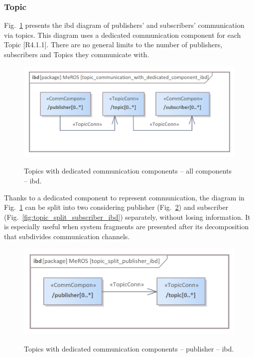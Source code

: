 \documentclass{ieeeaccess}
\begin{document}
	\subsubsection{Topic}
	\label{sec:metamodel-topic}
		
	Fig.~\ref{fig:topic_communication_with_dedicated_component_ibd} presents the ibd diagram of publishers' and subscribers' communication via topics. This diagram uses a dedicated communication component for each Topic [R4.1.1]. There are no general limits to the number of publishers, subscribers and Topics they communicate with. 
	
	\begin{figure}[htb]
		\centering
		\begin{center}
			{\includegraphics[scale=0.8]{img/meros_pkg/topic_communication_with_dedicated_component_ibd.png}}
		\end{center}
		\caption{Topics with dedicated communication components -- all components -- ibd.} 
		\label{fig:topic_communication_with_dedicated_component_ibd}
	\end{figure}

	Thanks to a dedicated component to represent communication, the diagram in Fig.~\ref{fig:topic_communication_with_dedicated_component_ibd} can be split into two considering publisher (Fig.~\ref{fig:topic_split_publisher_ibd}) and subscriber (Fig.~\ref{fig:topic_split_subscriber_ibd}) separately, without losing information. It is especially useful when system fragments are presented after its decomposition that subdivides communication channels.
	
	\begin{figure}[htb]
		\centering
		\begin{center}
			{\includegraphics[scale=0.9]{img/meros_pkg/topic_split_publisher_ibd.png}}
		\end{center}
		\caption{Topics with dedicated communication components -- publisher -- ibd.} 
		\label{fig:topic_split_publisher_ibd}
	\end{figure}
\end{document}

